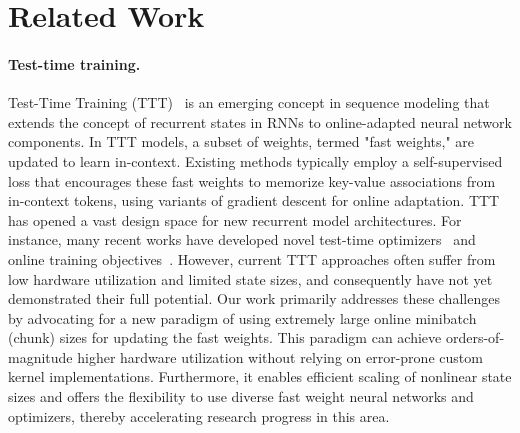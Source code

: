 \section{Related Work}
\label{appendix_sec:realted_work}




\paragraph{Test-time training.} Test-Time Training (TTT)~\cite{sun2024learning}  is an emerging concept in sequence modeling that extends the concept of recurrent states in RNNs to online-adapted neural network components. In TTT models, a subset of weights, termed "fast weights," are updated to learn in-context. Existing methods typically employ a self-supervised loss that encourages these fast weights to memorize key-value associations from in-context tokens, using variants of gradient descent for online adaptation. TTT~\cite{sun2024learning,wang2025testtimeregressionunifyingframework} has opened a vast design space for new recurrent model architectures. For instance, many recent works have developed novel test-time optimizers~\cite{behrouz2024titans, karami2025lattice} and online training objectives~\cite{behrouz2025s}. However, current TTT approaches often suffer from low hardware utilization and limited state sizes, and consequently have not yet demonstrated their full potential.  Our work primarily addresses these challenges by advocating for a new paradigm of using extremely large online minibatch (chunk) sizes for updating the fast weights. This paradigm can achieve orders-of-magnitude higher hardware utilization without relying on error-prone custom kernel implementations. Furthermore, it enables efficient scaling of nonlinear state sizes and offers the flexibility to use diverse fast weight neural networks and optimizers, thereby accelerating research progress in this area.


